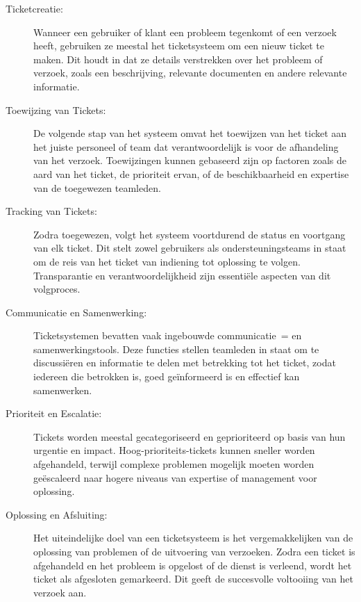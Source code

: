  \begin{description}
  \item[Ticketcreatie:] Wanneer een gebruiker of klant een probleem tegenkomt of een verzoek heeft, gebruiken ze meestal het ticketsysteem om een nieuw ticket te maken. Dit houdt in dat ze details verstrekken over het probleem of verzoek, zoals een beschrijving, relevante documenten en andere relevante informatie.

  \item[Toewijzing van Tickets:] De volgende stap van het systeem omvat het toewijzen van het ticket aan het juiste personeel of team dat verantwoordelijk is voor de afhandeling van het verzoek. Toewijzingen kunnen gebaseerd zijn op factoren zoals de aard van het ticket, de prioriteit ervan, of de beschikbaarheid en expertise van de toegewezen teamleden.

  \item[Tracking van Tickets:] Zodra toegewezen, volgt het systeem voortdurend de status en voortgang van elk ticket. Dit stelt zowel gebruikers als ondersteuningsteams in staat om de reis van het ticket van indiening tot oplossing te volgen. Transparantie en verantwoordelijkheid zijn essentiële aspecten van dit volgproces.

  \item[Communicatie en Samenwerking:] Ticketsystemen bevatten vaak ingebouwde communicatie~= en samenwerkingstools. Deze functies stellen teamleden in staat om te discussiëren en informatie te delen met betrekking tot het ticket, zodat iedereen die betrokken is, goed geïnformeerd is en effectief kan samenwerken.

  \item[Prioriteit en Escalatie:] Tickets worden meestal gecategoriseerd en geprioriteerd op basis van hun urgentie en impact. Hoog-prioriteits-tickets kunnen sneller worden afgehandeld, terwijl complexe problemen mogelijk moeten worden geëscaleerd naar hogere niveaus van expertise of management voor oplossing.

  \item[Oplossing en Afsluiting:] Het uiteindelijke doel van een ticketsysteem is het vergemakkelijken van de oplossing van problemen of de uitvoering van verzoeken. Zodra een ticket is afgehandeld en het probleem is opgelost of de dienst is verleend, wordt het ticket als afgesloten gemarkeerd. Dit geeft de succesvolle voltooiing van het verzoek aan.
 \end{description}


